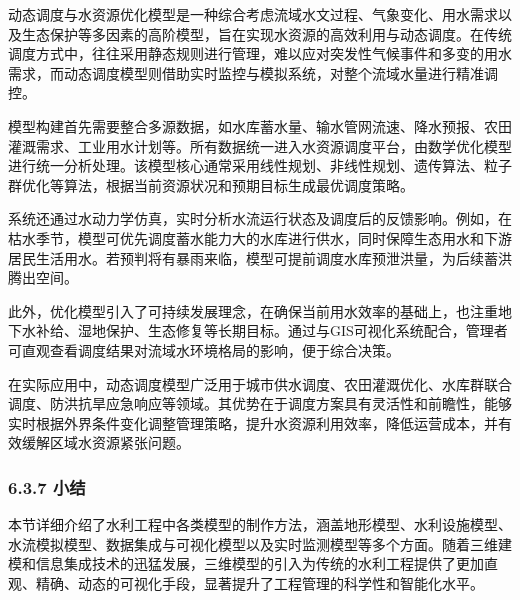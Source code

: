 动态调度与水资源优化模型是一种综合考虑流域水文过程、气象变化、用水需求以及生态保护等多因素的高阶模型，旨在实现水资源的高效利用与动态调度。在传统调度方式中，往往采用静态规则进行管理，难以应对突发性气候事件和多变的用水需求，而动态调度模型则借助实时监控与模拟系统，对整个流域水量进行精准调控。

模型构建首先需要整合多源数据，如水库蓄水量、输水管网流速、降水预报、农田灌溉需求、工业用水计划等。所有数据统一进入水资源调度平台，由数学优化模型进行统一分析处理。该模型核心通常采用线性规划、非线性规划、遗传算法、粒子群优化等算法，根据当前资源状况和预期目标生成最优调度策略。

系统还通过水动力学仿真，实时分析水流运行状态及调度后的反馈影响。例如，在枯水季节，模型可优先调度蓄水能力大的水库进行供水，同时保障生态用水和下游居民生活用水。若预判将有暴雨来临，模型可提前调度水库预泄洪量，为后续蓄洪腾出空间。

此外，优化模型引入了可持续发展理念，在确保当前用水效率的基础上，也注重地下水补给、湿地保护、生态修复等长期目标。通过与GIS可视化系统配合，管理者可直观查看调度结果对流域水环境格局的影响，便于综合决策。

在实际应用中，动态调度模型广泛用于城市供水调度、农田灌溉优化、水库群联合调度、防洪抗旱应急响应等领域。其优势在于调度方案具有灵活性和前瞻性，能够实时根据外界条件变化调整管理策略，提升水资源利用效率，降低运营成本，并有效缓解区域水资源紧张问题。

\subsubsection{6.3.7 小结}\label{ux5c0fux7ed3-2}

本节详细介绍了水利工程中各类模型的制作方法，涵盖地形模型、水利设施模型、水流模拟模型、数据集成与可视化模型以及实时监测模型等多个方面。随着三维建模和信息集成技术的迅猛发展，三维模型的引入为传统的水利工程提供了更加直观、精确、动态的可视化手段，显著提升了工程管理的科学性和智能化水平。

